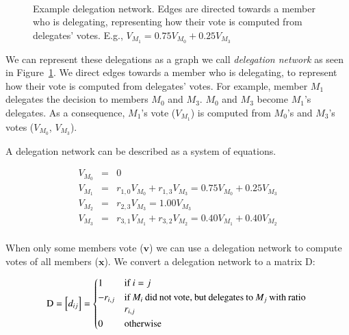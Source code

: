 \documentclass{sigchi}
\begin{document}
\begin{figure}
  \centering
  \caption{Example delegation network. Edges are directed towards a member who is delegating, representing how their
  vote is computed from delegates' votes. E.g., $V_{M_1} = 0.75 V_{M_0} + 0.25 V_{M_3}$}~\label{fig:delegation-network}
\end{figure}

We can represent these delegations as a graph we call \emph{delegation network} as seen in
Figure~\ref{fig:delegation-network}.
We direct edges towards a member who is delegating, to represent how their vote is computed from delegates' votes.
For example, member $M_1$ delegates the decision to members $M_0$ and $M_3$.
$M_0$ and $M_3$ become $M_1$'s delegates.
As a consequence, $M_1$'s vote ($V_{M_1}$) is computed from $M_0$'s and $M_3$'s votes ($V_{M_0}$, $V_{M_3}$).

A delegation network can be described as a system of equations.

\begin{displaymath}
\begin{array}{rcl}
V_{M_0} & = & 0 \\
V_{M_1} & = & r_{1,0} V_{M_0} + r_{1,3} V_{M_3} = 0.75 V_{M_0} + 0.25 V_{M_3} \\
V_{M_2} & = & r_{2,3} V_{M_3} = 1.00 V_{M_3} \\
V_{M_3} & = & r_{3,1} V_{M_1} + r_{3,2} V_{M_2} = 0.40 V_{M_1} + 0.40 V_{M_2} \\
\end{array}
\end{displaymath}

When only some members vote ($\mathbf{v}$) we can use a delegation network to compute votes
of all members ($\mathbf{x}$).
We convert a delegation network to a matrix $\mathrm{D}$:

\begin{displaymath}
\mathrm{D} = \left[d_{ij}\right] = \begin{dcases*}
 1 & if $i = j$ \\
 -r_{i,j} & \parbox[t]{.55\columnwidth}{if $M_i$ did not vote, but delegates to $M_j$ with ratio $r_{i,j}$} \\
 0 & otherwise \\
\end{dcases*}
\end{displaymath}
\end{document}
